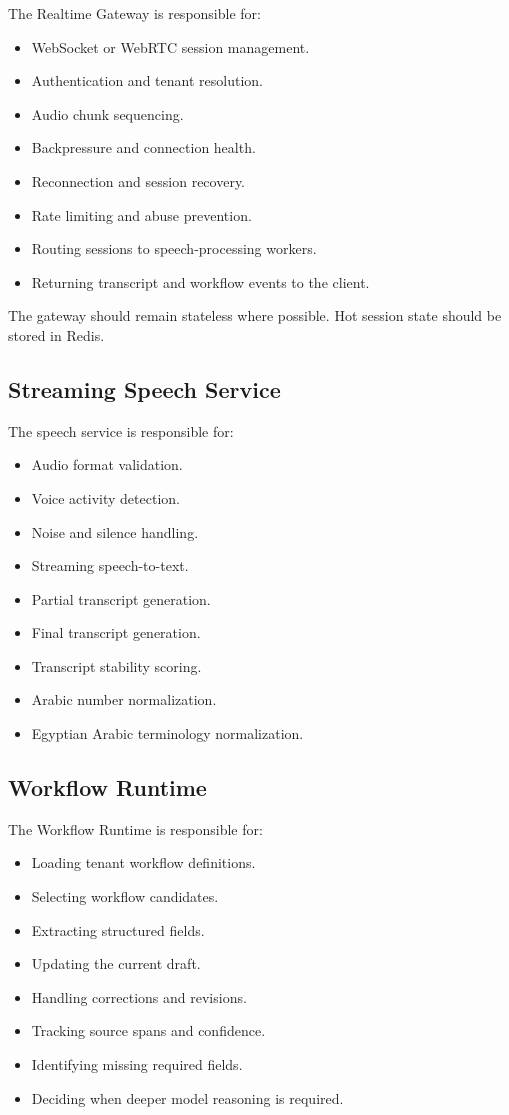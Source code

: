 \documentclass[11pt,a4paper]{article}
\begin{document}
The Realtime Gateway is responsible for:

\begin{itemize}
\item WebSocket or WebRTC session management.
\item Authentication and tenant resolution.
\item Audio chunk sequencing.
\item Backpressure and connection health.
\item Reconnection and session recovery.
\item Rate limiting and abuse prevention.
\item Routing sessions to speech-processing workers.
\item Returning transcript and workflow events to the client.
\end{itemize}

The gateway should remain stateless where possible. Hot session state
should be stored in Redis.

\subsection{Streaming Speech Service}

The speech service is responsible for:

\begin{itemize}
\item Audio format validation.
\item Voice activity detection.
\item Noise and silence handling.
\item Streaming speech-to-text.
\item Partial transcript generation.
\item Final transcript generation.
\item Transcript stability scoring.
\item Arabic number normalization.
\item Egyptian Arabic terminology normalization.
\end{itemize}

\subsection{Workflow Runtime}

The Workflow Runtime is responsible for:

\begin{itemize}
\item Loading tenant workflow definitions.
\item Selecting workflow candidates.
\item Extracting structured fields.
\item Updating the current draft.
\item Handling corrections and revisions.
\item Tracking source spans and confidence.
\item Identifying missing required fields.
\item Deciding when deeper model reasoning is required.
\end{itemize}
\end{document}
